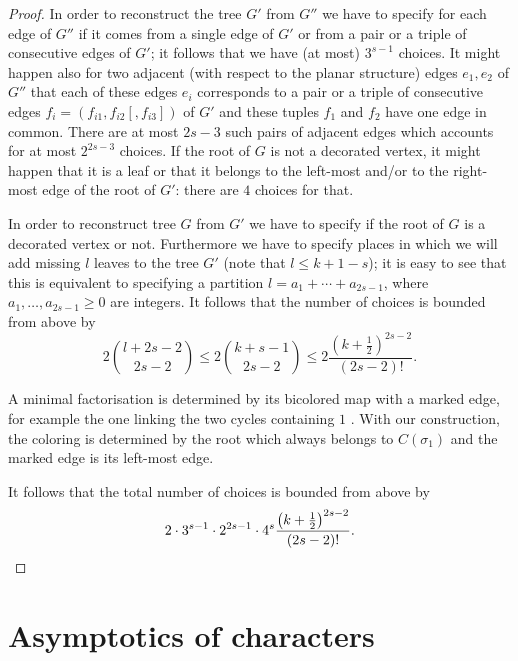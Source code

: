 \documentclass[12pt]{amsart}
\theoremstyle{plain}
\theoremstyle{remark}
\newcommand{\Gobciete}{G'}
\newcommand{\GobcieteBardzo}{G''}
\begin{document}
\begin{proof}
In order to reconstruct the tree $\Gobciete$ from $\GobcieteBardzo$ we have to
specify for each edge of $\GobcieteBardzo$ if it comes from a single edge of
$\Gobciete$ or from a pair or a triple of consecutive edges of $\Gobciete$; it
follows that we have (at most) $3^{s-1}$ choices. It might happen also for two
adjacent (with respect to the planar structure) edges $e_1,e_2$ of
$\GobcieteBardzo$ that each of these edges $e_i$ corresponds to a pair or a
triple of consecutive edges $f_i=(f_{i1},f_{i2}[,f_{i3}])$ of $\Gobciete$ and
these tuples $f_1$ and $f_2$ have one edge in common. There are
at most $2s-3$ such
pairs of adjacent edges which accounts for at most $2^{2s-3}$ choices. If
the root of $G$ is not a decorated vertex, it might happen that it is a leaf
or that it belongs to the left-most and/or to the right-most edge of the
root of $\Gobciete$: there are $4$ choices for that.

In order to reconstruct tree $G$ from $\Gobciete$ we have to specify if the root
of $G$ is a decorated vertex or not. Furthermore we have to specify places in
which we will add missing $l$ leaves to the tree $\Gobciete$ (note that $l\leq
k+1-s$); it is easy to see that this is equivalent to specifying a partition
$l=a_1+\cdots+a_{2s-1}$, where $a_1,\dots,a_{2s-1}\geq 0$ are integers. It
follows that the number of choices is bounded from above by 
$$ 2 \binom{l+2s-2}{2s-2}\leq 2 \binom{k+s-1}{2s-2}\leq 2
\frac{\left(k+\frac{1}{2}\right)^{2s-2}}{(2s-2)!}. $$

A minimal factorisation is determined by its bicolored map with
a marked edge, for example the one linking the two cycles containing $1$
\cite{GouldenJackson1992}. With our
construction, the coloring is determined by the root which always belongs to $C(\sigma_1)$ and the marked edge is its
left-most edge.

It follows that the total number of choices is bounded from above by
\begin{displaymath}
2 \cdot 3^{s-1}\cdot 2^{2s-1} \cdot 4^s
\frac{\left(k+\frac{1}{2}\right)^{2s-2}}{(2s-2)!}.\qedhere 
\end{displaymath}
\end{proof}



\section{Asymptotics of characters}
\label{sec:asymptotics-characters}
\end{document}
